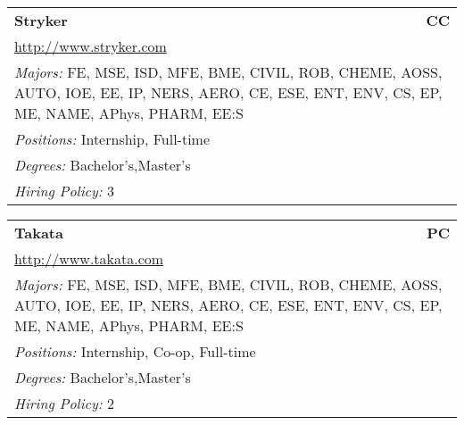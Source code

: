 \documentclass[twoside]{article}
\begin{document}
\begin{center}
\begin{multicols}{3}
\begin{FlushLeft}
\begin{minipage}{\columnwidth}
\end{minipage}
 
\begin{minipage}{\columnwidth}\begin{tabularx}{.95\columnwidth}{Xr}
                 {\Large\bf Stryker} & {\Large\bf CC}\\
    \multicolumn{2}{p{.95\columnwidth}}{\url{http://www.stryker.com}}\\
    \multicolumn{2}{p{.95\columnwidth}}{\emph{Majors:} FE, MSE, ISD, MFE, BME, CIVIL, ROB, CHEME, AOSS, AUTO, IOE, EE, IP, NERS, AERO, CE, ESE, ENT, ENV, CS, EP, ME, NAME, APhys, PHARM, EE:S}\\
    \multicolumn{2}{p{.95\columnwidth}}{\emph{Positions:} Internship, Full-time}\\
    \multicolumn{2}{p{.95\columnwidth}}{\emph{Degrees:} Bachelor's,Master's}\\
    \multicolumn{2}{p{.95\columnwidth}}{\emph{Hiring Policy:} 3}\\
    \end{tabularx}
    
\end{minipage}
 
\begin{minipage}{\columnwidth}\begin{tabularx}{.95\columnwidth}{Xr}
                 {\Large\bf Takata} & {\Large\bf PC}\\
    \multicolumn{2}{p{.95\columnwidth}}{\url{http://www.takata.com}}\\
    \multicolumn{2}{p{.95\columnwidth}}{\emph{Majors:} FE, MSE, ISD, MFE, BME, CIVIL, ROB, CHEME, AOSS, AUTO, IOE, EE, IP, NERS, AERO, CE, ESE, ENT, ENV, CS, EP, ME, NAME, APhys, PHARM, EE:S}\\
    \multicolumn{2}{p{.95\columnwidth}}{\emph{Positions:} Internship, Co-op, Full-time}\\
    \multicolumn{2}{p{.95\columnwidth}}{\emph{Degrees:} Bachelor's,Master's}\\
    \multicolumn{2}{p{.95\columnwidth}}{\emph{Hiring Policy:} 2}\\
    \end{tabularx}
    
\end{minipage}
 

\end{FlushLeft}
\end{multicols}
\end{center}
\end{document}
